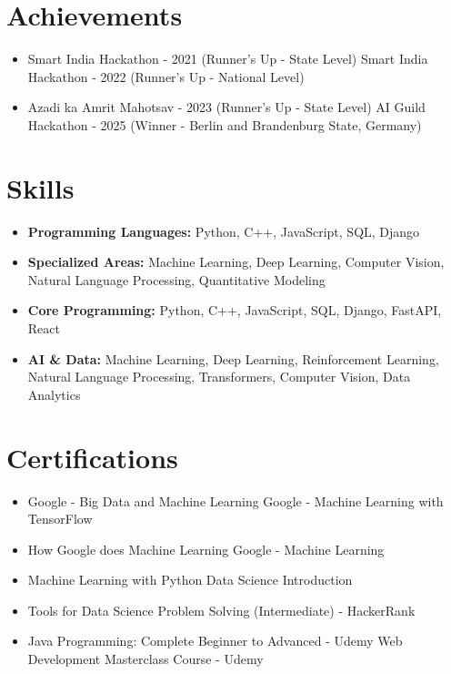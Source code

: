 \documentclass[a4paper,10pt]{article}
\begin{document}
\section*{Achievements}
\begin{itemize}
\item Smart India Hackathon - 2021 (Runner's Up - State Level) \hfill Smart India Hackathon - 2022 (Runner's Up - National Level)
\item Azadi ka Amrit Mahotsav - 2023 (Runner's Up - State Level) \hfill AI Guild Hackathon - 2025 (Winner - Berlin and Brandenburg State, Germany)
\end{itemize}

\section*{Skills}
\begin{itemize}
  \item \textbf{Programming Languages:} Python, C++, JavaScript, SQL, Django
  \item \textbf{Specialized Areas:} Machine Learning, Deep Learning, Computer Vision, Natural Language Processing, Quantitative Modeling
  \item \textbf{Core Programming:} Python, C++, JavaScript, SQL, Django, FastAPI, React
  \item \textbf{AI \& Data:} Machine Learning, Deep Learning, Reinforcement Learning, Natural Language Processing, Transformers, Computer Vision, Data Analytics
\end{itemize}

\section*{Certifications}
\begin{itemize}
\item Google - Big Data and Machine Learning \hfill Google - Machine Learning with TensorFlow
\item How Google does Machine Learning \hfill Google - Machine Learning
\item Machine Learning with Python \hfill Data Science Introduction
\item Tools for Data Science \hfill Problem Solving (Intermediate) - HackerRank
\item Java Programming: Complete Beginner to Advanced - Udemy \hfill Web Development Masterclass Course - Udemy
\end{itemize}
\end{document}
